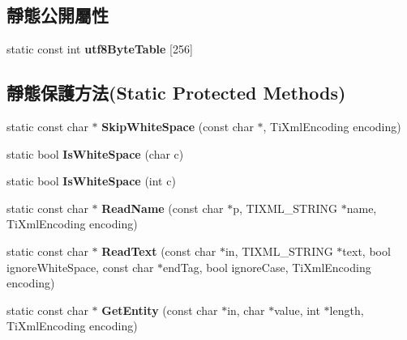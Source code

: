 \subsection*{靜態公開屬性}
\begin{DoxyCompactItemize}
\item 
static const int {\bfseries utf8\+Byte\+Table} \mbox{[}256\mbox{]}
\end{DoxyCompactItemize}
\subsection*{靜態保護方法(Static Protected Methods)}
\begin{DoxyCompactItemize}
\item 
static const char $\ast$ {\bfseries Skip\+White\+Space} (const char $\ast$, Ti\+Xml\+Encoding encoding)\hypertarget{class_ti_xml_base_ac0c3d66d8a9e6996a1fa016275e16875}{}\label{class_ti_xml_base_ac0c3d66d8a9e6996a1fa016275e16875}

\item 
static bool {\bfseries Is\+White\+Space} (char c)\hypertarget{class_ti_xml_base_af56296d561c0bab4bc8e198cdcf5c48e}{}\label{class_ti_xml_base_af56296d561c0bab4bc8e198cdcf5c48e}

\item 
static bool {\bfseries Is\+White\+Space} (int c)\hypertarget{class_ti_xml_base_a3de391ea9f4c4a8aa10d04480b048795}{}\label{class_ti_xml_base_a3de391ea9f4c4a8aa10d04480b048795}

\item 
static const char $\ast$ {\bfseries Read\+Name} (const char $\ast$p, T\+I\+X\+M\+L\+\_\+\+S\+T\+R\+I\+NG $\ast$name, Ti\+Xml\+Encoding encoding)\hypertarget{class_ti_xml_base_a1c21a6ab5f7b503acd91f35f183734b3}{}\label{class_ti_xml_base_a1c21a6ab5f7b503acd91f35f183734b3}

\item 
static const char $\ast$ {\bfseries Read\+Text} (const char $\ast$in, T\+I\+X\+M\+L\+\_\+\+S\+T\+R\+I\+NG $\ast$text, bool ignore\+White\+Space, const char $\ast$end\+Tag, bool ignore\+Case, Ti\+Xml\+Encoding encoding)\hypertarget{class_ti_xml_base_aa646c74921aa33156968b802bbf5566e}{}\label{class_ti_xml_base_aa646c74921aa33156968b802bbf5566e}

\item 
static const char $\ast$ {\bfseries Get\+Entity} (const char $\ast$in, char $\ast$value, int $\ast$length, Ti\+Xml\+Encoding encoding)\hypertarget{class_ti_xml_base_ac5c08bf3deffcda0bf8ce2958372b584}{}\label{class_ti_xml_base_ac5c08bf3deffcda0bf8ce2958372b584}


\end{DoxyCompactItemize}
